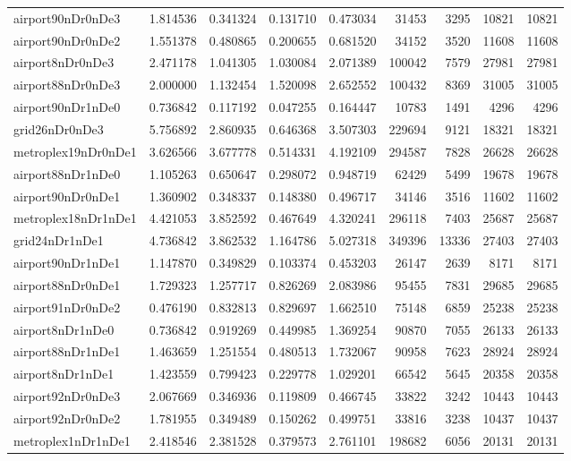 \begin{longtable}{|l|r|r|r|r|r|r|r|r|}
airport90nDr0nDe3 & 1.814536 & 0.341324 & 0.131710 & 0.473034 & 31453 & 3295 & 10821 & 10821 \\
airport90nDr0nDe2 & 1.551378 & 0.480865 & 0.200655 & 0.681520 & 34152 & 3520 & 11608 & 11608 \\
airport8nDr0nDe3 & 2.471178 & 1.041305 & 1.030084 & 2.071389 & 100042 & 7579 & 27981 & 27981 \\
airport88nDr0nDe3 & 2.000000 & 1.132454 & 1.520098 & 2.652552 & 100432 & 8369 & 31005 & 31005 \\
airport90nDr1nDe0 & 0.736842 & 0.117192 & 0.047255 & 0.164447 & 10783 & 1491 & 4296 & 4296 \\
grid26nDr0nDe3 & 5.756892 & 2.860935 & 0.646368 & 3.507303 & 229694 & 9121 & 18321 & 18321 \\
metroplex19nDr0nDe1 & 3.626566 & 3.677778 & 0.514331 & 4.192109 & 294587 & 7828 & 26628 & 26628 \\
airport88nDr1nDe0 & 1.105263 & 0.650647 & 0.298072 & 0.948719 & 62429 & 5499 & 19678 & 19678 \\
airport90nDr0nDe1 & 1.360902 & 0.348337 & 0.148380 & 0.496717 & 34146 & 3516 & 11602 & 11602 \\
metroplex18nDr1nDe1 & 4.421053 & 3.852592 & 0.467649 & 4.320241 & 296118 & 7403 & 25687 & 25687 \\
grid24nDr1nDe1 & 4.736842 & 3.862532 & 1.164786 & 5.027318 & 349396 & 13336 & 27403 & 27403 \\
airport90nDr1nDe1 & 1.147870 & 0.349829 & 0.103374 & 0.453203 & 26147 & 2639 & 8171 & 8171 \\
airport88nDr0nDe1 & 1.729323 & 1.257717 & 0.826269 & 2.083986 & 95455 & 7831 & 29685 & 29685 \\
airport91nDr0nDe2 & 0.476190 & 0.832813 & 0.829697 & 1.662510 & 75148 & 6859 & 25238 & 25238 \\
airport8nDr1nDe0 & 0.736842 & 0.919269 & 0.449985 & 1.369254 & 90870 & 7055 & 26133 & 26133 \\
airport88nDr1nDe1 & 1.463659 & 1.251554 & 0.480513 & 1.732067 & 90958 & 7623 & 28924 & 28924 \\
airport8nDr1nDe1 & 1.423559 & 0.799423 & 0.229778 & 1.029201 & 66542 & 5645 & 20358 & 20358 \\
airport92nDr0nDe3 & 2.067669 & 0.346936 & 0.119809 & 0.466745 & 33822 & 3242 & 10443 & 10443 \\
airport92nDr0nDe2 & 1.781955 & 0.349489 & 0.150262 & 0.499751 & 33816 & 3238 & 10437 & 10437 \\
metroplex1nDr1nDe1 & 2.418546 & 2.381528 & 0.379573 & 2.761101 & 198682 & 6056 & 20131 & 20131 \\

\end{longtable}
